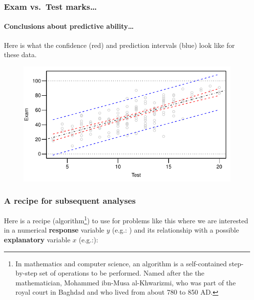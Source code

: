 \documentclass{beamer}\usepackage[]{graphicx}\usepackage[]{xcolor}
\begin{document}
\begin{frame}[fragile]
\frametitle{Exam vs.\ Test marks\ldots}
\framesubtitle{Conclusions about predictive ability\ldots}
Here is what the confidence ({\color{red}red}) and prediction intervals ({\color{blue}blue}) look like 
for these data.





\begin{figure}
  \centering
  \includegraphics{figure/RC-H02-037}
\end{figure}

\end{frame}






\begin{frame}[fragile]
\frametitle{A recipe for subsequent analyses}

Here is a recipe (algorithm\footnote{In mathematics and computer science, an algorithm  is a self-contained step-by-step set of operations to be performed. Named after the the mathematician, Mohammed ibn-Musa al-Khwarizmi, who was part of the royal court in Baghdad and who lived from about 780 to 850 AD. }) to use for problems like this where we are interested in a numerical \textbf{response} variable $y$ (e.g.: )  and its relationship with a possible \textbf{explanatory} variable $x$ (e.g.:):

\end{frame}
\end{document}
